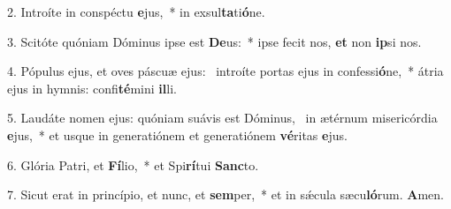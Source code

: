 2. Introíte in conspéctu \textbf{e}jus,~*  in exsul\textbf{ta}ti\textbf{ó}ne.\

3. Scitóte quóniam Dóminus ipse est \textbf{De}us:~*  ipse fecit nos, \textbf{et} non \textbf{ip}si nos.\

4. Pópulus ejus, et oves páscuæ ejus: \dag\  introíte portas ejus in confessi\textbf{ó}ne,~*  átria ejus in hymnis: confi\textbf{té}mini \textbf{il}li.\

5. Laudáte nomen ejus: quóniam suávis est Dóminus, \dag\  in ætérnum misericórdia \textbf{e}jus,~*  et usque in generatiónem et generatiónem \textbf{vé}ritas \textbf{e}jus.\

6. Glória Patri, et \textbf{Fí}lio,~*  et Spi\textbf{rí}tui \textbf{Sanc}to.\

7. Sicut erat in princípio, et nunc, et \textbf{sem}per,~*  et in sǽcula sæcu\textbf{ló}rum. \textbf{A}men.\

